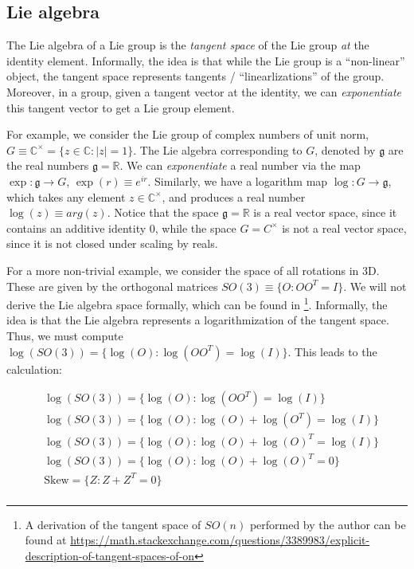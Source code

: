 \documentclass[11pt]{book}
\newcommand{\skewsym}{\mathrm{Skew}}
\newcommand{\C}{\ensuremath{\mathbb{C}}}
\begin{document}
\subsection{Lie algebra}
The Lie algebra of a Lie group is the \emph{tangent space} of the Lie group
\emph{at} the identity element. Informally, the idea is that while the Lie group is a
``non-linear'' object, the tangent space represents tangents / ``linearlizations'' of the group.
Moreover, in a group, given a tangent vector at the identity, we can \emph{exponentiate} this
tangent vector to get a Lie group element.

For example, we consider the Lie group of complex numbers of unit norm,
$G \equiv \C^\times = \{ z \in \C : |z| = 1 \}$. The Lie algebra corresponding to $G$, denoted
by $\mathfrak g$ are the real numbers $\mathfrak g = \mathbb R$. We can \emph{exponentiate}
a real number via the map $\exp : \mathfrak g \rightarrow G$, $\exp(r) \equiv e^{i r}$. Similarly,
we have a logarithm map $\log: G \rightarrow \mathfrak g$, which takes any
element $z \in \C^\times$, and produces a real number $\log(z) \equiv arg(z)$.
Notice that the space $\mathfrak g = \mathbb R$ is a real vector space, since it contains an
additive identity $0$, while the space $G = C^\times$ is not a real vector space, since it
is not closed under scaling by reals.

For a more non-trivial example, we consider the space of all rotations in 3D. These are given
by the orthogonal matrices $SO(3) \equiv \{ O : O O ^T = I \}$. We will not derive the Lie algebra
space formally, which can be found in \cite{absil2009optimisation} \footnote{A derivation of the tangent space of $SO(n)$
performed by the author can be found at \url{https://math.stackexchange.com/questions/3389983/explicit-description-of-tangent-spaces-of-on}}.
Informally, the idea is that the Lie algebra represents a logarithmization of the tangent space. Thus,
we must compute $\log(SO(3)) = \{ \log(O): \log(O O^T) = \log(I) \}$. This leads to the calculation:

\begin{align*}
&\log(SO(3)) = \{ \log(O): \log(O O^T) = \log(I) \} \\
&\log(SO(3)) = \{ \log(O): \log(O) + \log(O^T) = \log(I) \} \\
&\log(SO(3)) = \{ \log(O): \log(O) + \log(O)^T = \log(I) \} \\
&\log(SO(3)) = \{ \log(O): \log(O) + \log(O)^T = 0 \} \\
&\skewsym = \{ Z: Z + Z^T = 0 \} \\
\end{align*}
\end{document}
